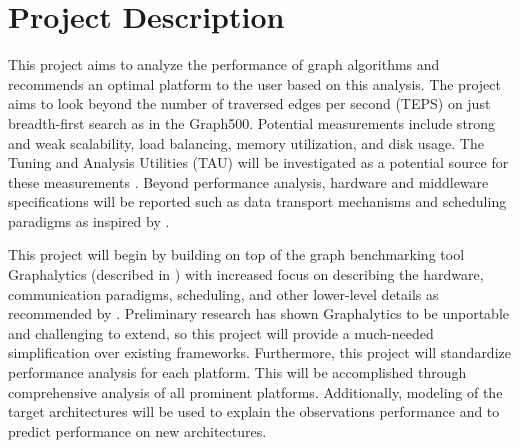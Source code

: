 \documentclass[11pt]{article}
\begin{document}
\section{Project Description}
This project aims to analyze the performance of graph algorithms and recommends an optimal platform to the user based on this analysis. The project aims to look beyond the number of traversed edges per second (TEPS) on just breadth-first search as in the Graph500. Potential measurements include strong and weak scalability, load balancing, memory utilization, and disk usage. The Tuning and Analysis Utilities (TAU) will be investigated as a potential source for these measurements \cite{Shende:2006:Tau}. Beyond performance analysis, hardware and middleware specifications will be reported such as data transport mechanisms and scheduling paradigms as inspired by \cite{Firoz:2016:Reportcard}.




This project will begin by building on top of the graph benchmarking tool Graphalytics (described in \cite{Guo:2014:Graphalytics}) with increased focus on describing the hardware, communication paradigms, scheduling, and other lower-level details as recommended by \cite{Firoz:2016:Reportcard}. Preliminary research has shown Graphalytics to be unportable and challenging to extend, so this project will provide a much-needed simplification over existing frameworks. Furthermore, this project will standardize performance analysis for each platform. This will be accomplished through comprehensive analysis of all prominent platforms. Additionally, modeling of the target architectures will be used to explain the observations performance and to predict performance on new architectures.
\end{document}
